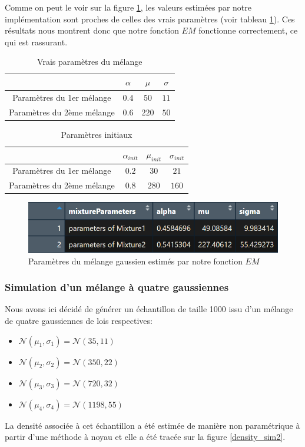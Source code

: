 \documentclass[a4paper,french,10pt]{article}
\begin{document}
 Comme on peut le voir sur la figure \ref{res_sim}, les valeurs estimées par notre implémentation sont proches de celles des vrais paramètres (voir tableau \ref{tab1}). Ces résultats nous montrent donc que notre fonction $EM$ fonctionne correctement, ce qui est rassurant.
 
 \begin{table}[htp]
 	\center
 	\begin{tabular}{|c||c|c|c|}
 		\hline
 		& $\alpha$ & $\mu$ & $\sigma$\\
 		\hline
 		Paramètres du 1er mélange & $0.4$ & $50$ & $11$ \\
 		\hline
 		Paramètres du 2ème mélange & $0.6$ & $220$ & $50$ \\
 		\hline
 	\end{tabular}
 	\caption{Vrais paramètres du mélange}
 	\label{tab1}
 \end{table}

\begin{table}[htp]
	\center
	\begin{tabular}{|c||c|c|c|}
		\hline
		& $\alpha_{init}$ & $\mu_{init}$ & $\sigma_{init}$\\
		\hline
		Paramètres du 1er mélange & $0.2$ & $30$ & $21$ \\
		\hline
		Paramètres du 2ème mélange & $0.8$ & $280$ & $160$ \\
		\hline
	\end{tabular}
	\caption{Paramètres initiaux}
	\label{tab2}
\end{table}
 
 \begin{figure}[htp] 
 	\centering
 	\includegraphics[scale=0.9]{images/res_sim.png}
 	\caption{Paramètres du mélange gaussien estimés par notre fonction $EM$}
 	\label{res_sim}
 \end{figure}

\newpage


\subsubsection{Simulation d'un mélange à quatre gaussiennes}
Nous avons ici décidé de générer un échantillon de taille 1000 issu d'un mélange de quatre gaussiennes de lois respectives:
\begin{itemize}
	\item $\mathcal{N}(\mu_1, \sigma_1) = \mathcal{N}(35, 11)$
	\item $\mathcal{N}(\mu_2, \sigma_2) = \mathcal{N}(350, 22)$
	\item $\mathcal{N}(\mu_3, \sigma_3) = \mathcal{N}(720, 32)$
	\item $\mathcal{N}(\mu_4, \sigma_4) = \mathcal{N}(1198, 55)$
\end{itemize}
La densité associée à cet échantillon a été estimée de manière non paramétrique à partir d'une méthode à noyau et elle a été tracée sur la figure \ref{density_sim2}.
\end{document}
